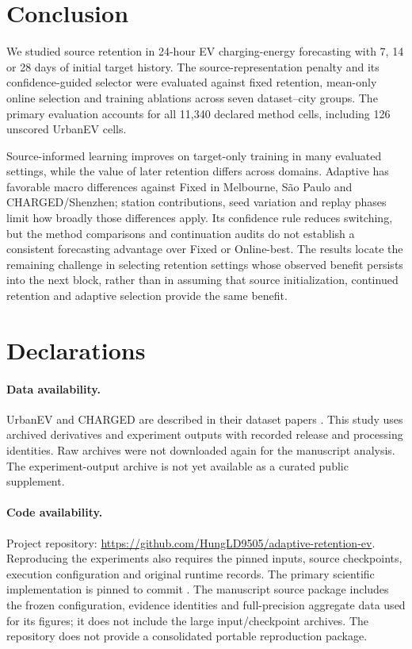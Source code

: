 \documentclass[pdflatex,iicol,sn-mathphys-num]{sn-jnl}
\begin{document}
\section{Conclusion}\label{sec:conclusion}
We studied source retention in 24-hour EV charging-energy forecasting with 7, 14 or 28 days of initial target history. The source-representation penalty and its confidence-guided selector were evaluated against fixed retention, mean-only online selection and training ablations across seven dataset--city groups. The primary evaluation accounts for all 11,340 declared method cells, including 126 unscored UrbanEV cells.

Source-informed learning improves on target-only training in many evaluated settings, while the value of later retention differs across domains. Adaptive has favorable macro differences against Fixed in Melbourne, S\~ao Paulo and CHARGED/Shenzhen; station contributions, seed variation and replay phases limit how broadly those differences apply. Its confidence rule reduces switching, but the method comparisons and continuation audits do not establish a consistent forecasting advantage over Fixed or Online-best. The results locate the remaining challenge in selecting retention settings whose observed benefit persists into the next block, rather than in assuming that source initialization, continued retention and adaptive selection provide the same benefit.

\backmatter
\section*{Declarations}
\paragraph{Data availability.} UrbanEV and CHARGED are described in their dataset papers \cite{urbanev2025,charged2025}. This study uses archived derivatives and experiment outputs with recorded release and processing identities. Raw archives were not downloaded again for the manuscript analysis. The experiment-output archive is not yet available as a curated public supplement.
\paragraph{Code availability.} Project repository: \url{https://github.com/HungLD9505/adaptive-retention-ev}. Reproducing the experiments also requires the pinned inputs, source checkpoints, execution configuration and original runtime records. The primary scientific implementation is pinned to commit \texttt{}. The manuscript source package includes the frozen configuration, evidence identities and full-precision aggregate data used for its figures; it does not include the large input/checkpoint archives. The repository does not provide a consolidated portable reproduction package.
\end{document}

